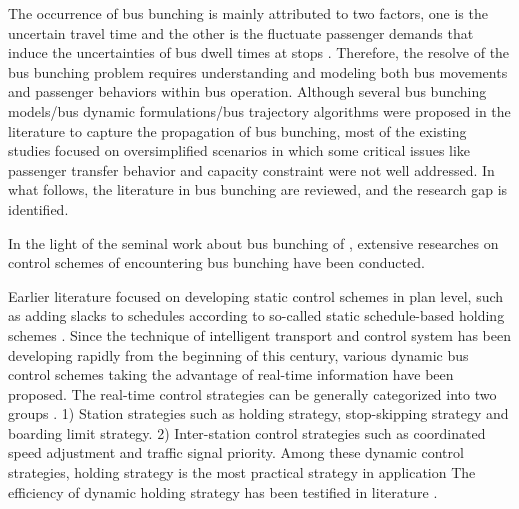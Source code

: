 \documentclass[smallextended]{svjour3}       %
\begin{document}
\begin{Abstract}
The occurrence of bus bunching is mainly attributed to two factors, one is the uncertain travel time and the other is the fluctuate passenger demands that induce the uncertainties of bus dwell times at stops \citep{2015Fonzone}. Therefore, the resolve of the bus bunching problem requires understanding and modeling both bus movements and passenger behaviors within bus operation. Although several bus bunching models/bus dynamic formulations/bus trajectory algorithms were proposed in the literature to capture the propagation of bus bunching, most of the existing studies focused on oversimplified scenarios in which some critical issues like passenger transfer behavior and capacity constraint were not well addressed.
In what follows, the literature in bus bunching are reviewed, and the research gap is identified.

In the light of the seminal work about bus bunching of \cite{1964Nwell}, 
extensive researches on control schemes of encountering bus bunching have been conducted.

Earlier literature focused on developing static control schemes in plan level, 
such as adding slacks to schedules according to so-called static schedule-based holding schemes 
\citep{1989Abkowitz,2001Eberlein}.%
Since the technique of intelligent transport and control system has been developing rapidly from the beginning of this century, 
various dynamic bus control schemes taking the advantage of real-time information have been proposed.
The real-time control strategies can be generally categorized into two groups \citep{2015Ibarra-Rojas}.
1) Station strategies such as holding strategy, stop-skipping strategy and boarding limit strategy.
2) Inter-station control strategies such as coordinated speed adjustment and traffic signal priority.
Among these dynamic control strategies, holding strategy is the most practical strategy in application \citep{2013Cats,2001Eberlein}
The efficiency of dynamic holding strategy has been testified in literature
\citep{2009Daganzo,2011Xuan,2012ABartholdi,2015Argote-Cabanero}.


\end{Abstract}
\end{document}
